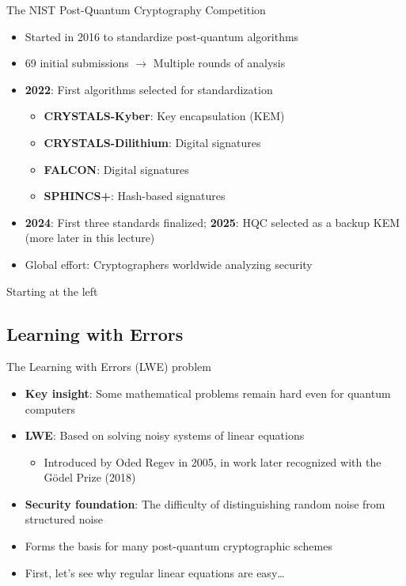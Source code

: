 \ifdefined\PRESENTATION\else\PassOptionsToClass{handout}{beamer}\fi\documentclass[aspectratio=169, lualatex]{beamer}
\begin{document}
\begin{frame}{The NIST Post-Quantum Cryptography Competition}
	\begin{itemize}
		\item Started in 2016 to standardize post-quantum algorithms
		\item 69 initial submissions $\rightarrow$ Multiple rounds of analysis
		\item \textbf{2022}: First algorithms selected for standardization
		      \begin{itemize}
			      \item \textbf{CRYSTALS-Kyber}: Key encapsulation (KEM)
			      \item \textbf{CRYSTALS-Dilithium}: Digital signatures
			      \item \textbf{FALCON}: Digital signatures
			      \item \textbf{SPHINCS+}: Hash-based signatures
		      \end{itemize}
		\item \textbf{2024}: First three standards finalized; \textbf{2025}: HQC selected as a backup KEM (more later in this lecture)
		\item Global effort: Cryptographers worldwide analyzing security
	\end{itemize}
\end{frame}

\begin{frame}{Starting at the left}
\end{frame}

\subsection{Learning with Errors}

\begin{frame}{The Learning with Errors (LWE) problem}
	\begin{itemize}
		\item \textbf{Key insight}: Some mathematical problems remain hard even for quantum computers
		\item \textbf{LWE}: Based on solving noisy systems of linear equations
		      \begin{itemize}
			      \item Introduced by Oded Regev in 2005, in work later recognized with the G\"odel Prize (2018)
		      \end{itemize}
		\item \textbf{Security foundation}: The difficulty of distinguishing random noise from structured noise
		\item Forms the basis for many post-quantum cryptographic schemes
		\item First, let's see why regular linear equations are easy\ldots
	\end{itemize}
\end{frame}
\end{document}
